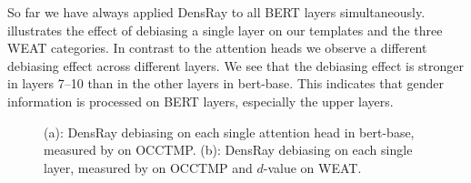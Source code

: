 So far we have always applied DensRay to all BERT layers
simultaneously.   illustrates the effect of
debiasing a single  layer on our templates and the three
WEAT categories.  In contrast to the attention heads we observe a different debiasing effect across different layers. We see that the debiasing effect is
stronger in layers 7--10 than in the other layers in
bert-base. This indicates that gender information is processed on BERT layers, especially the upper layers.
\begin{figure}[h]
	\centering
	\footnotesize
	\centering
	\caption{(a): DensRay debiasing on each single attention head in bert-base, measured by  on OCCTMP. (b): DensRay debiasing on each single layer, measured by  on  OCCTMP and $d$-value on WEAT.}
\end{figure}

